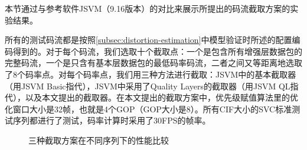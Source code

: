 本节通过与参考软件JSVM（9.16版本）的对比来展示所提出的码流截取方案的实验结果。

所有的测试码流都是按照\ref{subsec:distortion-estimation}中模型验证时所述的配置编码得到的。对于每个码流，我们选取十个截取点：一个是包含所有增强层数据包的完整码流，一个是只含有基本层数据包的最低码率码流，二者之间又等距离地选取了8个码率点。对每个码率点，我们用三种方法进行截取：JSVM中的基本截取器（用JSVM Basic指代），JSVM中采用了Quality Layers的截取器（用JSVM QL指代），以及本文提出的截取器。在本文提出的截取方案中，优先级赋值算法里的优化窗口大小是32帧，也就是4个GOP（GOP大小是8）。所有CIF大小的SVC标准测试序列都进行了测试，码率计算时采用了30FPS的帧率。

\begin{figure}[h]
	\centering
	\qquad
	\caption{三种截取方案在不同序列下的性能比较}
	\label{fig:extraction-performance}
\end{figure}

